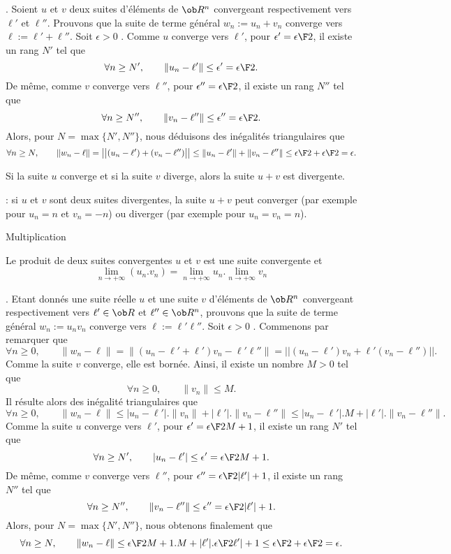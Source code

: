 \Demonstration. Soient $u$ et $v$ deux suites d'\'el\'ements de $\ob R^n$ convergeant respectivement vers $\ell'$ et $\ell''$. 
Prouvons que la suite de terme g\'en\'eral $w_n:=u_n+v_n$ converge vers $\ell:=\ell'+\ell''$. \pn 
 Soit $\epsilon>0$ . Comme $u$ converge vers $\ell'$, pour $\epsilon'={\epsilon\F2}$,  il existe un rang $N'$  tel que 
$$
\forall n\ge N', \qquad \|u_n-\ell'\|\le \epsilon'={\epsilon\F2}. 
$$
De m\^eme, comme $v$ converge vers $\ell''$, pour $\epsilon''={\epsilon\F2}$,  il existe un rang $N''$  tel que 
$$
\forall n\ge N'', \qquad \|v_n-\ell''\|\le \epsilon''={\epsilon\F2}. 
$$
Alors,  pour $N=\max\{N',N''\}$, nous d\'eduisons des in\'egalit\'es triangulaires que 
$$
\forall n\ge N , \qquad \|w_n-\ell\| =\big|\big|(u_n-\ell')+(v_n-\ell'')\big|\big|\le \|u_n-\ell'\|+\|v_n-\ell''\|\le
{\epsilon\F 2}+{\epsilon\F2}=\epsilon. 
$$ \CQFD


Si la suite $u$ converge et si la suite $v$ diverge, alors la suite $u+v$ est divergente. 


\Remarque : si $u$ et $v$ sont deux suites divergentes, la suite $u+v$ peut converger (par exemple pour $u_n=n$ et $v_n=-n$) ou diverger (par exemple pour $u_n=v_n=n$). 
\bigskip


\Concept [Index=Suites!limites!multiplication] Multiplication

Le produit de deux suites convergentes $u$ et $v$ est une suite convergente et 
$$
\lim_{n\to+\infty}(u_n.v_n)=\lim_{n\to+\infty}u_n.\lim_{n\to+\infty}v_n
$$

\Demonstration. Etant donn\'es une suite r\'eelle $u$ et une suite $v$ d'\'el\'ements de $\ob R^n$ convergeant respectivement vers $\ell'\in\ob R$ et $\ell''\in\ob R^n$, 
prouvons que la suite de terme g\'en\'eral $w_n:=u_nv_n$ converge vers $\ell:=\ell'\ell''$. \pn 
 Soit $\epsilon>0$ . Commen\cced ons par remarquer que 
$$
\forall n\ge0, \qquad \|w_n-\ell\|=\|(u_n-\ell'+\ell')v_n-\ell'\ell''\|=\big|\big|(u_n-\ell')v_n+\ell'(v_n-\ell'')\big|\big|. 
$$
Comme la suite $v$ converge, elle est born\'ee. Ainsi, il existe un nombre $M>0$ tel que 
$$
\forall n\ge0, \qquad \|v_n\|\le M.
$$
Il r\'esulte alors des in\'egalit\'e triangulaires que 
$$
\forall n\ge0, \qquad \|w_n-\ell\|\le |u_n-\ell'|.\|v_n\|+|\ell'|.\|v_n-\ell''\|\le |u_n-\ell'|.M+|\ell'|.\|v_n-\ell''\|.
$$
Comme la suite $u$ converge vers $\ell'$, pour $\epsilon'={\epsilon\F2M+1}$, il existe un rang $N'$ tel que 
$$
\forall n\ge N', \qquad |u_n-\ell'|\le \epsilon'={\epsilon\F 2M+1}. 
$$
De m\^eme, comme $v$ converge vers $\ell''$, pour $\epsilon''={\epsilon\F2|\ell'|+1}$, il existe un rang $N''$ tel que 
$$
\forall n\ge N'', \qquad \|v_n-\ell''\|\le \epsilon''={\epsilon\F2|\ell'|+1}. 
$$
Alors, pour $N=\max\{N',N''\}$, nous obtenons finalement que 
$$
\forall n\ge N, \qquad \|w_n-\ell\|\le {\epsilon\F2M+1}.M+|\ell'|.{\epsilon\F2\ell'|+1}\le{\epsilon\F2}+{\epsilon\F2}=\epsilon.
$$
\CQFD


